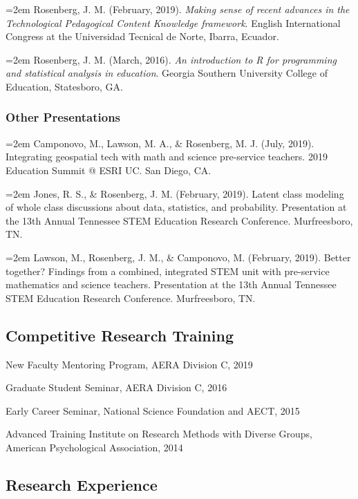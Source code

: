 \documentclass[14,]{article}
\begin{document}
\hangindent=2em Rosenberg, J. M. (February, 2019). \emph{Making sense of
recent advances in the Technological Pedagogical Content Knowledge
framework}. English International Congress at the Universidad Tecnical
de Norte, Ibarra, Ecuador.

\hangindent=2em Rosenberg, J. M. (March, 2016). \emph{An introduction to
R for programming and statistical analysis in education}. Georgia
Southern University College of Education, Statesboro, GA.

\hypertarget{other-presentations}{%
\subsubsection{Other Presentations}\label{other-presentations}}

\hangindent=2em Camponovo, M., Lawson, M. A., \& Rosenberg, M. J. (July,
2019). Integrating geospatial tech with math and science pre-service
teachers. 2019 Education Summit @ ESRI UC. San Diego, CA.

\hangindent=2em Jones, R. S., \& Rosenberg, J. M. (February, 2019).
Latent class modeling of whole class discussions about data, statistics,
and probability. Presentation at the 13th Annual Tennessee STEM
Education Research Conference. Murfreesboro, TN.

\hangindent=2em Lawson, M., Rosenberg, J. M., \& Camponovo, M.
(February, 2019). Better together? Findings from a combined, integrated
STEM unit with pre-service mathematics and science teachers.
Presentation at the 13th Annual Tennessee STEM Education Research
Conference. Murfreesboro, TN.

\hypertarget{competitive-research-training}{%
\subsection{Competitive Research
Training}\label{competitive-research-training}}

New Faculty Mentoring Program, AERA Division C, 2019

Graduate Student Seminar, AERA Division C, 2016

Early Career Seminar, National Science Foundation and AECT, 2015

Advanced Training Institute on Research Methods with Diverse Groups,
American Psychological Association, 2014

\hypertarget{research-experience}{%
\subsection{Research Experience}\label{research-experience}}
\end{document}
